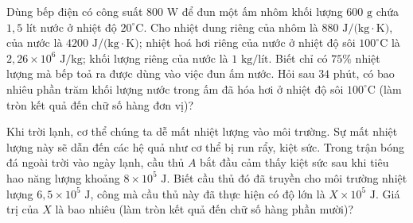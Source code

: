 \begin{ex}
	Dùng bếp điện có công suất $800\text{ W}$ để đun một ấm nhôm khối lượng $600\text{ g}$ chứa $1{,}5\text{ lít}$ nước ở nhiệt độ $20^\circ\text{C}$. Cho nhiệt dung riêng của nhôm là $880\text{ J/(kg}\cdot\text{K)}$, của nước là $4200\text{ J/(kg}\cdot\text{K)}$; nhiệt hoá hơi riêng của nước ở nhiệt độ sôi $100^\circ\text{C}$ là $2{,}26 \times 10^6\text{ J/kg}$; khối lượng riêng của nước là $1\text{ kg/lít}$. Biết chỉ có $75\%$ nhiệt lượng mà bếp toả ra được dùng vào việc đun ấm nước. Hỏi sau $34\text{ phút}$, có bao nhiêu phần trăm khối lượng nước trong ấm đã hóa hơi ở nhiệt độ sôi $100^\circ\text{C}$ (làm tròn kết quả đến chữ số hàng đơn vị)?

	\par{}
\end{ex}

\begin{ex}
	Khi trời lạnh, cơ thể chúng ta dễ mất nhiệt lượng vào môi trường. Sự mất nhiệt lượng này sẽ dẫn đến các hệ quả như cơ thể bị run rẩy, kiệt sức. Trong trận bóng đá ngoài trời vào ngày lạnh, cầu thủ $A$ bắt đầu cảm thấy kiệt sức sau khi tiêu hao năng lượng khoảng $8 \times 10^5\text{ J}$. Biết cầu thủ đó đã truyền cho môi trường nhiệt lượng $6{,}5 \times 10^5\text{ J}$, công mà cầu thủ này đã thực hiện có độ lớn là $X \times 10^5\text{ J}$. Giá trị của $X$ là bao nhiêu (làm tròn kết quả đến chữ số hàng phần mười)?

	\par{}
\end{ex}

